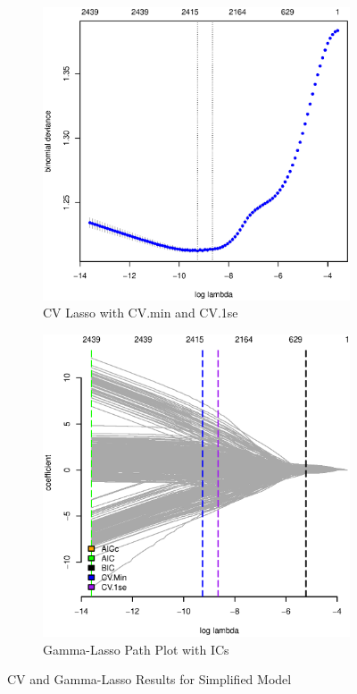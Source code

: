 \documentclass[11pt, fleqn]{article}
\begin{document}
\begin{figure}
  \centering
  \begin{subfigure}[b]{0.49\textwidth}
    \includegraphics[width=\textwidth]{pl_cv_nhl_gamlr_a.eps}
    \caption{CV Lasso with CV.min and CV.1se}
    \label{fig:pl_cv_nhl}
  \end{subfigure}
  \hfill
  \begin{subfigure}[b]{0.49\textwidth}
    \includegraphics[width=\textwidth]{ic_pl_nhl_c.eps}
    \caption{Gamma-Lasso Path Plot with ICs}
    \label{fig:pl_ic_nhl}
  \end{subfigure}
  \caption{CV and Gamma-Lasso Results for Simplified Model}
\end{figure}
\end{document}
